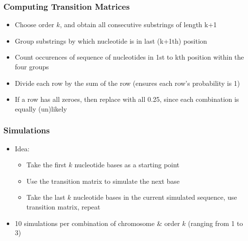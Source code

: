 \documentclass[xcolor=dvipsnames]{beamer} \usepackage{beamerthemesplit}
\begin{document}
\begin{frame}
	\frametitle{Computing Transition Matrices}
    \begin{itemize}
    	\item Choose order $k$, and obtain all consecutive substrings of length k+1
        \item Group substrings by which nucleotide is in last (k+1th) position
        \item Count occurences of sequence of nucleotides in 1st to kth position within the four groups
        \item Divide each row by the sum of the row (ensures each row's probability is 1)
        \item If a row has all zeroes, then replace with all 0.25, since each combination is equally (un)likely
    \end{itemize}
\end{frame}



\begin{frame}
	\frametitle{Simulations}
    \begin{itemize}
    	\item Idea:
        \begin{itemize}
    		\item Take the first $k$ nucleotide bases as a starting point
        	\item Use the transition matrix to simulate the next base
        	\item Take the last $k$ nucleotide bases in the current simulated sequence, use transition matrix, repeat
        \end{itemize}
        \item 10 simulations per combination of chromosome \& order $k$ (ranging from 1 to 3)
        
    \end{itemize}
\end{frame}
\end{document}
